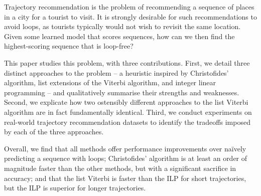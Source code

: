 
Trajectory recommendation is the problem of recommending a sequence of places in a city for a tourist to visit.
It is strongly desirable for such recommendations to avoid loops, as tourists typically would not wish to revisit the same location.
Given some learned model that scores sequences, how can we then find the highest-scoring sequence that is loop-free?

This paper studies this problem, with three contributions.
First, we detail three distinct approaches to the problem -- a heuristic inspired by Christofides' algorithm, list extensions of the Viterbi algorithm, and integer linear programming -- and qualitatively summarise their strengths and weaknesses.
Second, we explicate how two ostensibly different approaches to the list Viterbi algorithm \citep{seshadri1994list,nilsson2001sequentially} are in fact fundamentally identical.
Third, we conduct experiments on real-world trajectory recommendation datasets to identify the tradeoffs imposed by each of the three approaches.

Overall, we find that
all methods offer performance improvements over na\"{i}vely predicting a sequence with loops;
Christofides' algorithm is at least an order of magnitude faster than the other methods, but with a significant sacrifice in accuracy;
and that the list Viterbi is faster than the ILP for short trajectories, but the ILP is superior for longer trajectories.
